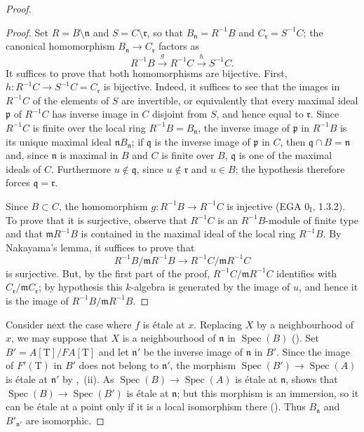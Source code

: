 \begin{proof}
\begin{proof}
Set $R=B\setminus\mathfrak{n}$ and $S=C\setminus\mathfrak{r}$, so that $B_\mathfrak{n}=R^{-1}B$ and $C_\mathfrak{r}=S^{-1}C$; the canonical homomorphism $B_\mathfrak{n}\to C_\mathfrak{r}$ factors as
\[
R^{-1}B\xrightarrow{g}R^{-1}C\xrightarrow{h}S^{-1}C.
\]
It suffices to prove that both homomorphisms are bijective.
First, $h:R^{-1}C\to S^{-1}C=C_\mathfrak{r}$ is bijective.
Indeed, it suffices to see that the images in $R^{-1}C$ of the elements of $S$ are invertible, or equivalently that every maximal ideal $\mathfrak{p}$ of $R^{-1}C$ has inverse image in $C$ disjoint from $S$, and hence equal to $\mathfrak{r}$.
Since $R^{-1}C$ is finite over the local ring $R^{-1}B=B_\mathfrak{n}$, the inverse image of $\mathfrak{p}$ in $R^{-1}B$ is its unique maximal ideal $\mathfrak{n}B_\mathfrak{n}$; if $\mathfrak{q}$ is the inverse image of $\mathfrak{p}$ in $C$, then $\mathfrak{q}\cap B=\mathfrak{n}$ and, since $\mathfrak{n}$ is maximal in $B$ and $C$ is finite over $B$, $\mathfrak{q}$ is one of the maximal ideals of $C$.
Furthermore $u\notin\mathfrak{q}$, since $u\notin\mathfrak{r}$ and $u\in B$; the hypothesis therefore forces $\mathfrak{q}=\mathfrak{r}$.

Since $B\subset C$, the homomorphism $g:R^{-1}B\to R^{-1}C$ is injective (EGA $0_{\mathrm{I}}$, 1.3.2).
To prove that it is surjective, observe that $R^{-1}C$ is an $R^{-1}B$-module of finite type and that $\mathfrak{m}R^{-1}B$ is contained in the maximal ideal of the local ring $R^{-1}B$.
By Nakayama's lemma, it suffices to prove that
\[
R^{-1}B/\mathfrak{m}R^{-1}B\longrightarrow R^{-1}C/\mathfrak{m}R^{-1}C
\]
is surjective.
But, by the first part of the proof, $R^{-1}C/\mathfrak{m}R^{-1}C$ identifies with $C_\mathfrak{r}/\mathfrak{m}C_\mathfrak{r}$; by hypothesis this $k$-algebra is generated by the image of $u$, and hence it is the image of $R^{-1}B/\mathfrak{m}R^{-1}B$.
\end{proof}

Consider next the case where $f$ is \'etale at $x$.
Replacing $X$ by a neighbourhood of $x$, we may suppose that $X$ is a neighbourhood of $\mathfrak{n}$ in $\operatorname{Spec}(B)$ ().
Set $B'=A[\mathrm{T}]/F A[\mathrm{T}]$ and let $\mathfrak{n}'$ be the inverse image of $\mathfrak{n}$ in $B'$.
Since the image of $F'(\mathrm{T})$ in $B'$ does not belong to $\mathfrak{n}'$, the morphism $\operatorname{Spec}(B')\to\operatorname{Spec}(A)$ is \'etale at $\mathfrak{n}'$ by ,~(ii).
As $\operatorname{Spec}(B)\to\operatorname{Spec}(A)$ is \'etale at $\mathfrak{n}$,  shows that $\operatorname{Spec}(B)\to\operatorname{Spec}(B')$ is \'etale at $\mathfrak{n}$; but this morphism is an immersion, so it can be \'etale at a point only if it is a local isomorphism there ().
Thus $B_\mathfrak{n}$ and $B'_{\mathfrak{n}'}$ are isomorphic.


\end{proof}
